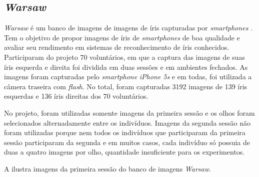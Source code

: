 \subsection{\textit{\acrshort{Warsaw}}}\label{sec:experimentos:db:warsaw}

\par \textit{\acrshort{Warsaw}} é um banco de imagens de imagens de íris capturadas por \textit{smartphones} \cite{trokielwicz2016-Warsaw}. Tem o objetivo de propor imagens de íris de \textit{smartphones} de boa qualidade e avaliar seu rendimento em sistemas de reconhecimento de íris conhecidos. Participaram do projeto 70 voluntários, em que a captura das imagens de suas íris esquerda e direita foi dividida em duas sessões e em ambientes fechados. As imagens foram capturadas pelo \textit{smartphone} \textit{iPhone 5s} e em todas, foi utilizada a câmera traseira com \textit{flash}. No total, foram capturadas 3192 imagens de 139 íris esquerdas e 136 íris direitas dos 70 voluntários.

\par No projeto, foram utilizadas somente imagens da primeira sessão e os olhos foram selecionados alternadamente entre os indivíduos. Imagens da segunda sessão não foram utilizadas porque nem todos os indivíduos que participaram da primeira sessão participaram da segunda e em muitos casos, cada indivíduo só possuia de duas a quatro imagens por olho, quantidade insuficiente para os experimentos.

\par A  ilustra imagens da primeira sessão do banco de imagens \textit{\acrshort{Warsaw}}.

